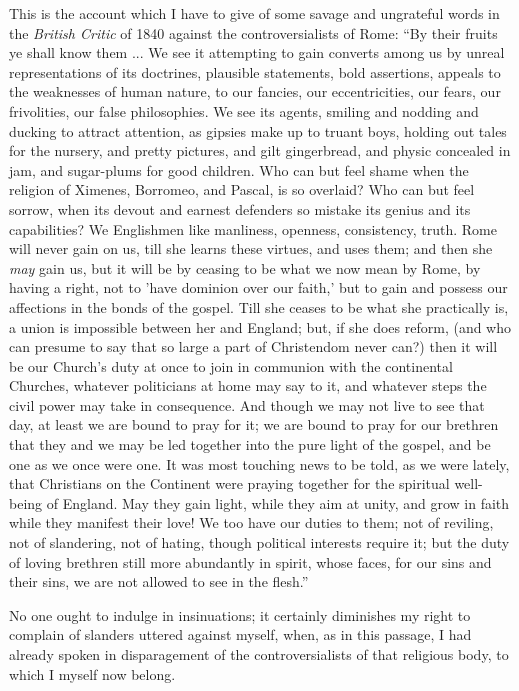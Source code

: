 This is the account which I have to give of some savage and
ungrateful words in the \emph{British Critic} of 1840 against the
controversialists of Rome: ``By their fruits ye shall know them ...
We see it attempting to gain converts among us by unreal representations
of its doctrines, plausible statements, bold assertions, appeals to the
weaknesses of human nature, to our fancies, our eccentricities, our
fears, our frivolities, our false philosophies. We see its agents,
smiling and nodding and ducking to attract attention, as gipsies make up to truant boys, holding out tales for the nursery, and
pretty pictures, and gilt gingerbread, and physic concealed in jam, and
sugar-plums for good children. Who can but feel shame when the religion
of Ximenes, Borromeo, and Pascal, is so overlaid? Who can but feel
sorrow, when its devout and earnest defenders so mistake its genius and
its capabilities? We Englishmen like manliness, openness, consistency,
truth. Rome will never gain on us, till she learns these virtues, and
uses them; and then she \emph{may} gain us, but it will be by ceasing
to be what we now mean by Rome, by having a right, not to 'have dominion
over our faith,' but to gain and possess our affections in the bonds of
the gospel. Till she ceases to be what she practically is, a union is
impossible between her and England; but, if she does reform, (and
who can presume to say that so large a part of Christendom never can?)
then it will be our Church's duty at once to join in communion with the
continental Churches, whatever politicians at home may say to it, and
whatever steps the civil power may take in consequence. And though we
may not live to see that day, at least we are bound to pray for it; we
are bound to pray for our brethren that they and we may be led together
into the pure light of the gospel, and be one as we once were one. It
was most touching news to be told, as we were lately, that Christians on
the Continent were praying together for the spiritual well-being of
England. May they gain light, while they aim at unity, and grow in faith
while they manifest their love! We too have our duties to them; not of
reviling, not of slandering, not of hating, though political interests
require it; but the duty of loving brethren still more abundantly in
spirit, whose faces, for our sins and their sins, we are not allowed to
see in the flesh.''

No one ought to indulge in insinuations; it certainly diminishes my
right to complain of slanders uttered against myself, when, as in this
passage, I had already spoken in disparagement of the controversialists of that religious body, to which I myself now
belong.

